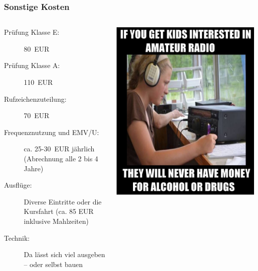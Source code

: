 \begin{frame}
  \frametitle{Sonstige Kosten}

  \begin{columns}
    \begin{description}
      \item[Prüfung Klasse E:]80~EUR
      \item[Prüfung Klasse A:]110~EUR
      \item[Rufzeichenzuteilung:]70~EUR
      \item[Frequenznutzung und EMV/U:]ca. 25-30~EUR jährlich (Abrechnung alle 2 bis 4 Jahre)
      \item[Ausflüge:]Diverse Eintritte oder die Kursfahrt (ca. 85 EUR inklusive Mahlzeiten)
      \item[Technik:]Da lässt sich viel ausgeben -- oder selbst bauen
    \end{description}

    \begin{center}
      \includegraphics[width=\textwidth]{o00/nomoney.jpg}
    \end{center}
  \end{columns}
\end{frame}

